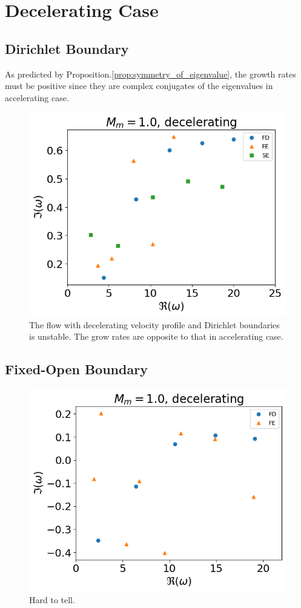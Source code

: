 \section{Decelerating Case}
\subsection{Dirichlet Boundary}
As predicted by Proposition.\ref{prop:symmetry_of_eigenvalue}, the growth rates must be positive since they are complex conjugates of the eigenvalues in accelerating case.

\begin{figure} [H]
	\centering
	\includegraphics[width=0.7\linewidth]{img/numerical_experiments/fixed_fixed/decelerating_v}
	\caption{The flow with decelerating velocity profile and Dirichlet boundaries is unstable. The grow rates are opposite to that in accelerating case.}
	\label{fig:decelerating_v_dirichlet}
\end{figure}

\subsection{Fixed-Open Boundary}
\begin{figure} [H]
	\centering
	\includegraphics[width=0.7\linewidth]{img/numerical_experiments/fixed_open/decelerating_v}
	\caption{Hard to tell.}
	\label{fig:decelerating_v_fixed_open}
\end{figure}